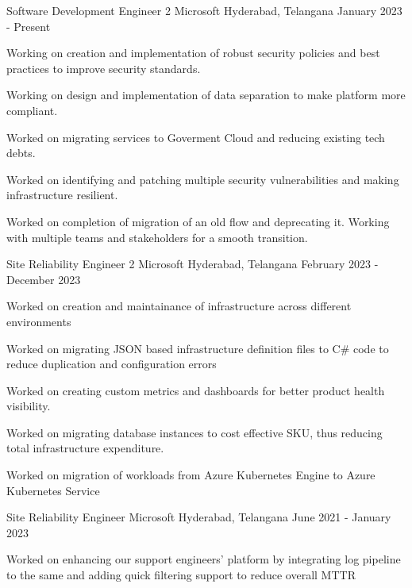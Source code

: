 
\begin{cventries}
  \cventry
  { Software Development Engineer 2}
  {Microsoft}
  {Hyderabad, Telangana}
  { January 2023 - Present}
  {
  \begin{cvitems}
      \item {Working on creation and implementation of robust security policies and best practices to improve security standards.}
      \item {Working on design and implementation of data separation to make platform more compliant.}
      \item {Worked on migrating services to Goverment Cloud and reducing existing tech debts.}
      \item {Worked on identifying and patching multiple security vulnerabilities and making infrastructure resilient.}
      \item {Worked on completion of migration of an old flow and deprecating it. Working with multiple teams and stakeholders for a smooth transition.}
  \end{cvitems}
  }
  \cventry
  {Site Reliability Engineer 2} %
  {Microsoft} %
  {Hyderabad, Telangana} %
  {February 2023 - December 2023} %
  {
  \begin{cvitems} %
  \item {Worked on creation and maintainance of infrastructure across different environments}  
  \item {Worked on migrating JSON based infrastructure definition files to C\# code to reduce duplication and configuration errors}
  \item {Worked on creating custom metrics and dashboards for better product health visibility.}
  \item {Worked on migrating database instances to cost effective SKU, thus reducing total infrastructure expenditure.}
  \item {Worked on migration of workloads from Azure Kubernetes Engine to Azure Kubernetes Service}
  \end{cvitems}
  }
  \cventry
  {Site Reliability Engineer} %
  {Microsoft} %
  {Hyderabad, Telangana} %
  {June 2021 - January 2023} %
  {
  \begin{cvitems} %
  \item {Worked on enhancing our support engineers' platform by integrating log pipeline to the same and adding quick filtering support to reduce overall MTTR}

\end{cvitems}}
\end{cventries}
